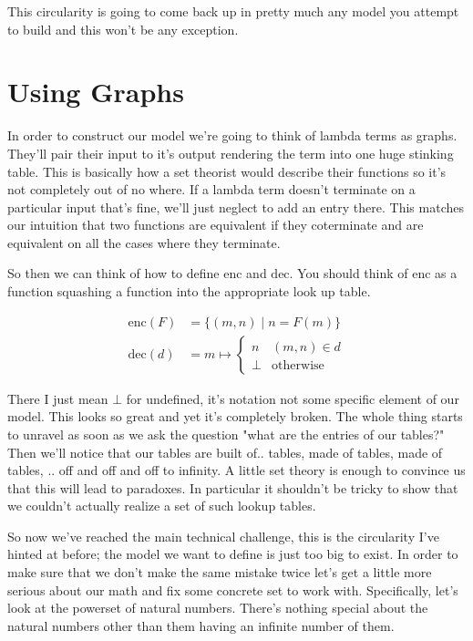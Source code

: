 \documentclass{amsart}
\newcommand{\enc}{\text{enc}}
\newcommand{\dec}{\text{dec}}
\begin{document}
This circularity is going to come back up in pretty much any model you
attempt to build and this won't be any exception.

\section{Using Graphs}

In order to construct our model we're going to think of lambda terms
as graphs. They'll pair their input to it's output rendering the term
into one huge stinking table. This is basically how a set theorist
would describe their functions so it's not completely out of no
where. If a lambda term doesn't terminate on a particular input that's
fine, we'll just neglect to add an entry there. This matches our
intuition that two functions are equivalent if they coterminate and
are equivalent on all the cases where they terminate.

So then we can think of how to define $\enc$ and $\dec$.
You should think of $\enc$ as a function squashing a
function into the appropriate look up table.

\begin{align*}
  \enc(F) &= \{(m, n) \mid n = F(m)\}\\
  \dec(d) &= m \mapsto
   \begin{cases}
      n & (m, n) \in d\\
      \bot & \text{otherwise}
   \end{cases}
\end{align*}

There I just mean $\bot$ for undefined, it's notation not some
specific element of our model. This looks so great and yet it's
completely broken. The whole thing starts to unravel as soon as we
ask the question "what are the entries of our tables?" Then we'll
notice that our tables are built of.. tables, made of tables, made of
tables, .. off and off and off to infinity. A little set theory is
enough to convince us that this will lead to paradoxes. In particular
it shouldn't be tricky to show that we couldn't actually realize a set
of such lookup tables.

So now we've reached the main technical challenge, this is the
circularity I've hinted at before; the model we want to define is just
too big to exist. In order to make sure that we don't make the same
mistake twice let's get a little more serious about our math and fix
some concrete set to work with. Specifically, let's look at the
powerset of natural numbers. There's nothing special about the natural
numbers other than them having an infinite number of them.
\end{document}
